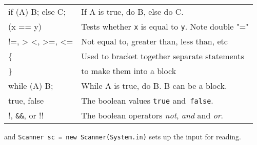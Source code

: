 \begin{tabular}{@{\ttfamily}l l}
if (A) B; else C; & If A is true, do B, else do C.\\
(x == y) & Tests whether \texttt{x} is equal to \texttt{y}.  Note double "="\\
!=, > <, >=, <= & Not equal to, greater than, less than, etc\\
\{ & Used to bracket together separate statements\\
\} & to make them into a block\\
while (A) B; & While A is true, do B.  B can be a block.\\
true, false & The boolean values \texttt{true} and\texttt{ false}.\\
!, \verb+&&+, or !!  & The boolean operators \emph{not}, \emph{and} and \emph{or}.\\
\end{tabular}
\vspace*{5pt}

\noindent and
\verb+Scanner sc = new Scanner(System.in)+  sets up the input for reading.


